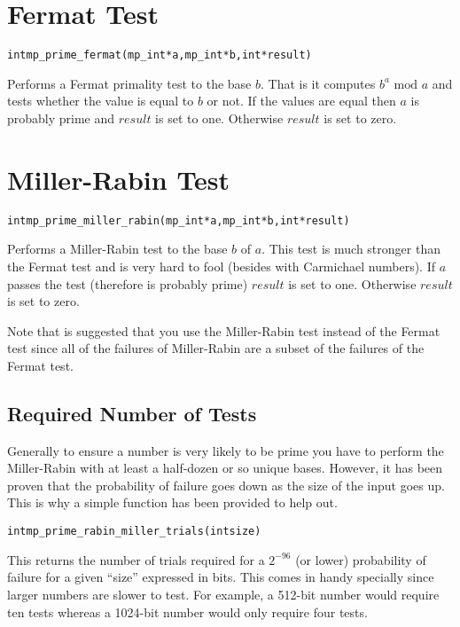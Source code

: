 \documentclass[synpaper]{book}
\begin{document}
\section{Fermat Test}
\begin{alltt}
int mp_prime_fermat (mp_int * a, mp_int * b, int *result)
\end{alltt}
Performs a Fermat primality test to the base $b$.  That is it computes $b^a \mbox{ mod }a$ and tests whether the value is
equal to $b$ or not.  If the values are equal then $a$ is probably prime and $result$ is set to one.  Otherwise $result$
is set to zero.

\section{Miller-Rabin Test}
\begin{alltt}
int mp_prime_miller_rabin (mp_int * a, mp_int * b, int *result)
\end{alltt}
Performs a Miller-Rabin test to the base $b$ of $a$.  This test is much stronger than the Fermat test and is very hard to
fool (besides with Carmichael numbers).  If $a$ passes the test (therefore is probably prime) $result$ is set to one.
Otherwise $result$ is set to zero.

Note that is suggested that you use the Miller-Rabin test instead of the Fermat test since all of the failures of
Miller-Rabin are a subset of the failures of the Fermat test.

\subsection{Required Number of Tests}
Generally to ensure a number is very likely to be prime you have to perform the Miller-Rabin with at least a half-dozen
or so unique bases.  However, it has been proven that the probability of failure goes down as the size of the input goes up.
This is why a simple function has been provided to help out.

\begin{alltt}
int mp_prime_rabin_miller_trials(int size)
\end{alltt}
This returns the number of trials required for a $2^{-96}$ (or lower) probability of failure for a given ``size'' expressed
in bits.  This comes in handy specially since larger numbers are slower to test.  For example, a 512-bit number would
require ten tests whereas a 1024-bit number would only require four tests.
\end{document}
